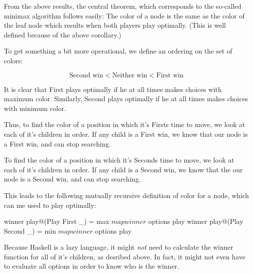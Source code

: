 From the above results, the central theorem, which corresponds to the so-called minimax algorithm follows easily:
The color of a node is the same as the color of the leaf node which results when both players play optimally.
(This is well defined because of the above corollary.)

To get something a bit more operational, we define an ordering on the set of colors:

\[
  \text{Second win} < \text{Neither win} < \text{First win}
\]

It is clear that First plays optimally if he at all times makes choices with maximum color.
Similarly, Second plays optimally if he at all times makes choices with minimum color.

Thus, to find the color of a position in which it's Firsts time to move, we look at each of it's children in order.
If any child is a First win, we know that our node is a First win, and can stop searching.

To find the color of a position in which it's Seconds time to move, we look at each of it's children in order.
If any child is a Second win, we know that the our node is a Second win, and can stop searching.

This leads to the following mutually recursive definition of color for a node, which can me used to play optimally:

\begin{code}
  winner play@(Play First _) = 
    max $ map winner $ options play
  winner play@(Play Second _) = 
    min $ map winner $ options play
\end{code}

Because Haskell is a lazy language, it might \emph{not} need to calculate the winner function for all of it's children, as desribed above. In fact, it might not even have to evaluate all options in order to know who is the winner.
